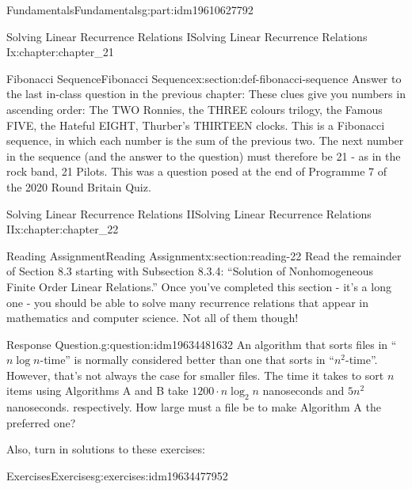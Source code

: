 \documentclass[oneside,10pt,]{book}
\numberwithin{equation}{section}
\begin{document}
\begin{partptx}{Fundamentals}{}{Fundamentals}{}{}{g:part:idm19610627792}
\begin{chapterptx}{Solving Linear Recurrence Relations I}{}{Solving Linear Recurrence Relations I}{}{}{x:chapter:chapter_21}
\begin{sectionptx}{Fibonacci Sequence}{}{Fibonacci Sequence}{}{}{x:section:def-fibonacci-sequence}
Answer to the last in-class question in the previous chapter: These clues give you numbers in ascending order: The TWO Ronnies, the THREE colours trilogy, the Famous FIVE, the Hateful EIGHT, Thurber's THIRTEEN clocks. This is a Fibonacci sequence, in which each number is the sum of the previous two. The next number in the sequence (and the answer to the question) must therefore be 21 - as in the rock band, 21 Pilots. This was a question posed at the end of Programme 7 of the 2020 Round Britain Quiz.%
\end{sectionptx}
\end{chapterptx}
%
\typeout{************************************************}
\typeout{************************************************}
%
\begin{chapterptx}{Solving Linear Recurrence Relations II}{}{Solving Linear Recurrence Relations II}{}{}{x:chapter:chapter_22}
\index{}%
%
%
\typeout{************************************************}
\typeout{************************************************}
%
\begin{sectionptx}{Reading Assignment}{}{Reading Assignment}{}{}{x:section:reading-22}
Read the remainder of Section 8.3 starting with Subsection 8.3.4: ``Solution of Nonhomogeneous Finite Order Linear Relations.''  Once you've completed this section - it's a long one - you should be able to solve many recurrence relations that appear in mathematics and computer science.   Not all of them though!%
\begin{question}{Response Question.}{g:question:idm19634481632}%
An algorithm that sorts files in ``\(n \log{n}\)-time'' is normally considered better than one that sorts in ``\(n^2\)-time''.  However, that's not always the case for smaller files.  The time it takes to sort \(n\) items using Algorithms A and B take \(1200\cdot n \log_2{n}\) nanoseconds and \(5 n^2\) nanoseconds. respectively. How large must a file be to make Algorithm A the preferred one?%
\end{question}
Also, turn in solutions to these exercises:%
%
%
\typeout{************************************************}
\typeout{************************************************}
%
\begin{exercises-subsection-numberless}{Exercises}{}{Exercises}{}{}{g:exercises:idm19634477952}
\par\medskip\noindent%
%
\begin{exercisegroup}

\end{exercisegroup}
\end{exercises-subsection-numberless}
\end{sectionptx}
\end{chapterptx}
\end{partptx}
\end{document}
